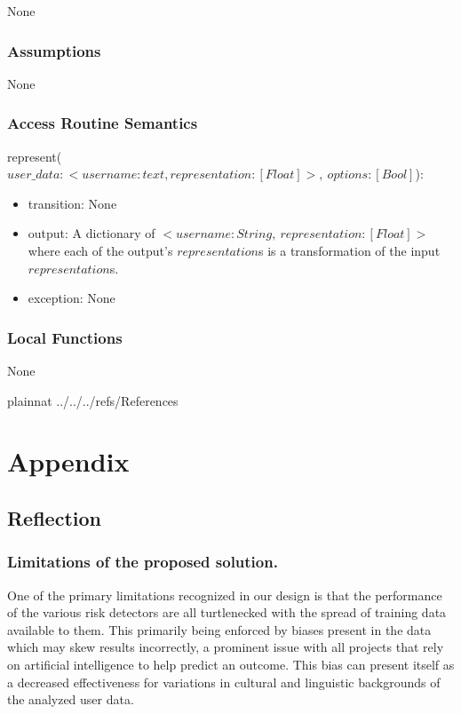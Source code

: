 \documentclass[12pt, titlepage]{article}
\begin{document}
None

\subsubsection{Assumptions}

None

\subsubsection{Access Routine Semantics}

\noindent represent($user\_data: <username: text, representation: [Float]>,\ options: [Bool]$):
\begin{itemize}
\item transition: None
\item output: A dictionary of $<username: String,\ representation: [Float]>$ where each of the output's $representation$s is a transformation of the input $representation$s.
\item exception: None
\end{itemize}

\subsubsection{Local Functions}

None

\newpage

 {plainnat}
 {../../../refs/References}

\newpage    

\section{Appendix} \label{Appendix}
\subsection{Reflection}

\subsubsection{Limitations of the proposed solution.}
One of the primary limitations recognized in our design is that the performance of the various risk detectors are all turtlenecked with the spread of training data available to them. This primarily being enforced by biases present in the data which may skew results incorrectly, a prominent issue with all projects that rely on artificial intelligence to help predict an outcome. This bias can present itself as a decreased effectiveness for variations in cultural and linguistic backgrounds of the analyzed user data.
\end{document}
